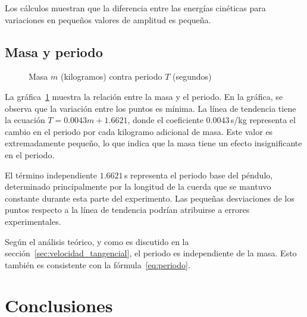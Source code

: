 \documentclass[twocolumn]{report}
\numberwithin{table}{section}
\begin{document}
Los cálculos muestran que la diferencia entre las energías cinéticas
para variaciones en pequeños valores de amplitud es pequeña.

\subsection{Masa y periodo}

\begin{figure}[ht]
  \centering
  \caption{Masa $m$ (kilogramos) contra periodo $T$
  (segundos)}\label{fig:masa_periodo}
\end{figure}

La gráfica~\ref{fig:masa_periodo} muestra la relación entre la masa y
el periodo. En la gráfica, se observa que la variación entre los
puntos es mínima. La línea de tendencia tiene la ecuación $T =
0.0043m + 1.6621$,
donde el coeficiente $0.0043$\,s/kg representa el cambio en el periodo por cada
kilogramo adicional de masa. Este valor es extremadamente pequeño, lo que indica
que la masa tiene un efecto insignificante en el periodo.

El término independiente $1.6621$\,s representa el periodo base del péndulo,
determinado principalmente por la longitud de la cuerda que se mantuvo constante
durante esta parte del experimento. Las pequeñas desviaciones de los puntos
respecto a la línea de tendencia podrían atribuirse a errores experimentales.

Según el análisis teórico, y como es discutido en
la sección~\ref{sec:velocidad_tangencial}, el periodo es independiente de la
masa. Esto también es consistente con la fórmula~\eqref{eq:periodo}.

\section{Conclusiones}
\end{document}

